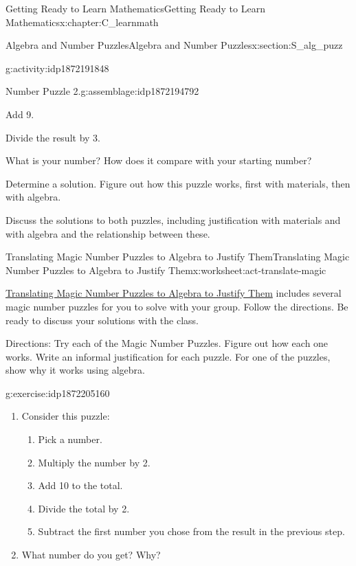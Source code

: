 \documentclass[oneside,10pt,]{book}
\numberwithin{equation}{chapter}
\begin{document}
\begin{chapterptx}{Getting Ready to Learn Mathematics}{}{Getting Ready to Learn Mathematics}{}{}{x:chapter:C_learnmath}
\begin{sectionptx}{Algebra and Number Puzzles}{}{Algebra and Number Puzzles}{}{}{x:section:S_alg_puzz}
\begin{activity}{}{g:activity:idp1872191848}
\begin{assemblage}{Number Puzzle 2.}{g:assemblage:idp1872194792}
\par
Add 9.%
\par
Divide the result by 3.%
\par
What is your number? How does it compare with your starting number?%
\end{assemblage}
 Determine a solution. Figure out how this puzzle works, first with materials, then with algebra.%
\par
Discuss the solutions to both puzzles, including justification with materials and with algebra and the relationship between these.%
\end{activity}%
%
%
\typeout{************************************************}
\typeout{************************************************}
%
\begin{worksheet-subsection}{Translating Magic Number Puzzles to Algebra to Justify Them}{}{Translating Magic Number Puzzles to Algebra to Justify Them}{}{}{x:worksheet:act-translate-magic}
\begin{introduction}{}%
\hyperref[x:worksheet:act-translate-magic]{Translating Magic Number Puzzles to Algebra to Justify Them} includes several magic number puzzles for you to solve with your group. Follow the directions. Be ready to discuss your solutions with the class.%
\par
Directions: Try each of the Magic Number Puzzles. Figure out how each one works. Write an informal justification for each puzzle. For one of the puzzles, show why it works using algebra.%
\end{introduction}%
\begin{divisionexercise}{1}{}{}{g:exercise:idp1872205160}%
\begin{enumerate}[font=\bfseries,label=(\alph*),ref=\alph*]
\item{}Consider this puzzle:%
\begin{enumerate}[label=(\alph*)]
\item{}Pick a number.%
\item{}Multiply the number by 2.%
\item{}Add 10 to the total.%
\item{}Divide the total by 2.%
\item{}Subtract the first number you chose from the result in the previous step.%
\end{enumerate}
%
\item{}What number do you get? Why?%

\end{enumerate}
\end{divisionexercise}
\end{worksheet-subsection}
\end{sectionptx}
\end{chapterptx}
\end{document}
